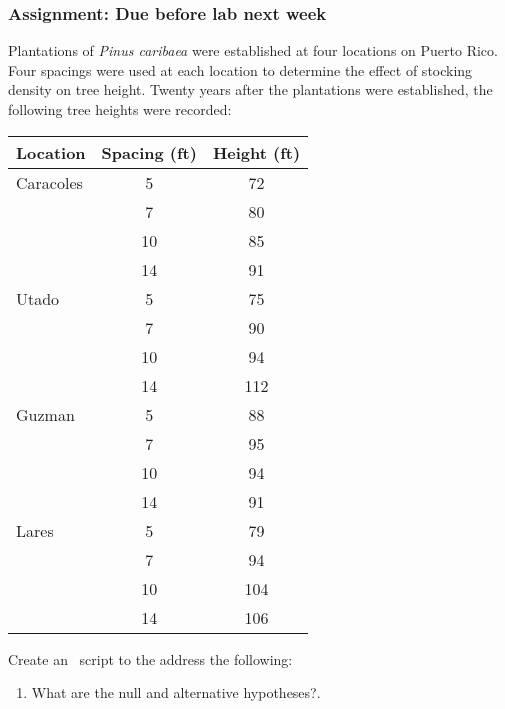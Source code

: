 \documentclass[color=usenames,dvipsnames]{beamer}\usepackage[]{graphicx}\usepackage[]{color}
\begin{document}
\begin{frame}
  \frametitle{Assignment: Due before lab next week}
  \tiny
  Plantations of {\it Pinus caribaea} were established at
  four locations on Puerto Rico.  %
  Four spacings were used at each location to determine the effect of
  stocking density on tree height. Twenty years after the
  plantations were established, the following tree heights were
  recorded: \\ %
  \vfill
  {  \centering
    \tiny %
    \begin{tabular}{lcc}
      \hline
      Location  & Spacing (ft) & Height (ft) \\
      \hline
      Caracoles & 5            & 72          \\
                & 7            & 80          \\
                & 10           & 85          \\
                & 14           & 91          \\
      Utado     & 5            & 75          \\
                & 7            & 90          \\
                & 10           & 94          \\
                & 14           & 112         \\
      Guzman    & 5            & 88          \\
                & 7            & 95          \\
                & 10           & 94          \\
                & 14           & 91          \\
      Lares     & 5            & 79          \\
                & 7            & 94          \\
                & 10           & 104         \\
                & 14           & 106         \\
      \hline
    \end{tabular} %
  }
    Create an \R~script to the address the following:
    \begin{enumerate}[(1)]
      \item What are the null and alternative hypotheses?.

\end{enumerate}
\end{frame}
\end{document}

